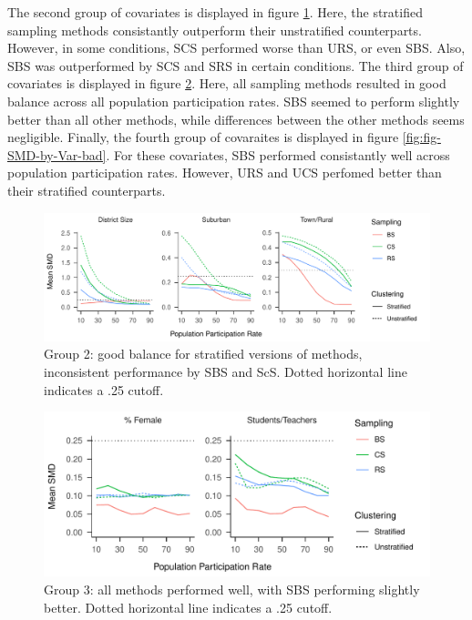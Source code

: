 \documentclass[man,floatsintext]{apa6}
\begin{document}
The second group of covariates is displayed in figure \ref{fig:fig-SMD-by-Var-good2}. Here, the stratified sampling methods consistantly outperform their unstratified counterparts. However, in some conditions, SCS performed worse than URS, or even SBS. Also, SBS was outperformed by SCS and SRS in certain conditions. The third group of covariates is displayed in figure \ref{fig:fig-SMD-by-Var-neutral}. Here, all sampling methods resulted in good balance across all population participation rates. SBS seemed to perform slightly better than all other methods, while differences between the other methods seems negligible. Finally, the fourth group of covaraites is displayed in figure \ref{fig:fig-SMD-by-Var-bad}. For these covariates, SBS performed consistantly well across population participation rates. However, URS and UCS perfomed better than their stratified counterparts.

\begin{figure}
\centering
\includegraphics{GenSamp-Paper_files/figure-latex/fig-SMD-by-Var-good2-1.pdf}
\caption{\label{fig:fig-SMD-by-Var-good2}Group 2: good balance for stratified versions of methods, inconsistent performance by SBS and ScS. Dotted horizontal line indicates a .25 cutoff.}
\end{figure}

\begin{figure}
\centering
\includegraphics{GenSamp-Paper_files/figure-latex/fig-SMD-by-Var-neutral-1.pdf}
\caption{\label{fig:fig-SMD-by-Var-neutral}Group 3: all methods performed well, with SBS performing slightly better. Dotted horizontal line indicates a .25 cutoff.}
\end{figure}
\end{document}
